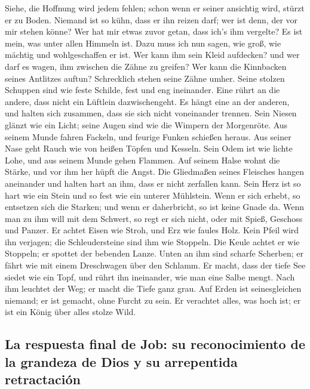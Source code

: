  Siehe, die Hoffnung wird jedem fehlen; schon wenn er
seiner ansichtig wird, stürzt er zu Boden.  Niemand ist so
kühn, dass er ihn reizen darf; wer ist denn, der vor mir stehen könne?
 Wer hat mir etwas zuvor getan, dass ich's ihm vergelte?
Es ist mein, was unter allen Himmeln ist.  Dazu muss ich
nun sagen, wie groß, wie mächtig und wohlgeschaffen er ist.
 Wer kann ihm sein Kleid aufdecken? und wer darf es wagen,
ihm zwischen die Zähne zu greifen?  Wer kann die
Kinnbacken seines Antlitzes auftun? Schrecklich stehen seine Zähne
umher.  Seine stolzen Schuppen sind wie feste Schilde,
fest und eng ineinander.  Eine rührt an die andere, dass
nicht ein Lüftlein dazwischengeht.  Es hängt eine an der
anderen, und halten sich zusammen, dass sie sich nicht voneinander
trennen.  Sein Niesen glänzt wie ein Licht; seine Augen
sind wie die Wimpern der Morgenröte.  Aus seinem Munde
fahren Fackeln, und feurige Funken schießen heraus.  Aus
seiner Nase geht Rauch wie von heißen Töpfen und Kesseln.
 Sein Odem ist wie lichte Lohe, und aus seinem Munde
gehen Flammen.  Auf seinem Halse wohnt die Stärke, und
vor ihm her hüpft die Angst.  Die Gliedmaßen seines
Fleisches hangen aneinander und halten hart an ihm, dass er nicht
zerfallen kann.  Sein Herz ist so hart wie ein Stein und
so fest wie ein unterer Mühlstein.  Wenn er sich erhebt,
so entsetzen sich die Starken; und wenn er daherbricht, so ist keine
Gnade da.  Wenn man zu ihm will mit dem Schwert, so regt
er sich nicht, oder mit Spieß, Geschoss und Panzer.  Er
achtet Eisen wie Stroh, und Erz wie faules Holz.  Kein
Pfeil wird ihn verjagen; die Schleudersteine sind ihm wie Stoppeln.
 Die Keule achtet er wie Stoppeln; er spottet der
bebenden Lanze.  Unten an ihm sind scharfe Scherben; er
fährt wie mit einem Dreschwagen über den Schlamm.  Er
macht, dass der tiefe See siedet wie ein Topf, und rührt ihn ineinander,
wie man eine Salbe mengt.  Nach ihm leuchtet der Weg; er
macht die Tiefe ganz grau.  Auf Erden ist seinesgleichen
niemand; er ist gemacht, ohne Furcht zu sein.  Er
verachtet alles, was hoch ist; er ist ein König über alles stolze Wild.

\hypertarget{la-respuesta-final-de-job-su-reconocimiento-de-la-grandeza-de-dios-y-su-arrepentida-retractaciuxf3n}{%
\subsection{La respuesta final de Job: su reconocimiento de la grandeza
de Dios y su arrepentida
retractación}\label{la-respuesta-final-de-job-su-reconocimiento-de-la-grandeza-de-dios-y-su-arrepentida-retractaciuxf3n}}

